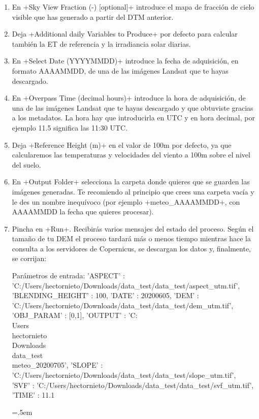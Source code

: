 \documentclass[a4paper,11pt]{article}
\newenvironment{cverbatim}
 {\SaveVerbatim{cverb}}
 {\endSaveVerbatim
  \flushleft\fboxrule=0pt\fboxsep=.5em
  \colorbox{bg}{\BUseVerbatim{cverb}}%
  \endflushleft
}
\begin{document}
\begin{enumerate}
  \item En \cverb+Sky View Fraction (-) [optional]+ introduce el mapa de fracción de cielo visible que has generado a partir del DTM anterior.
  
  \item Deja \cverb+Additional daily Variables to Produce+ por defecto para calcular también la ET de referencia y la irradiancia solar diarias.
  
  \item En \cverb+Select Date (YYYYMMDD)+ introduce la fecha de adquisición, en formato AAAAMMDD, de una de las imágenes Landsat que te hayas descargado.
  
  \item En \cverb+Overpass Time (decimal hours)+ introduce la hora de adquisición, de una de las imágenes Landsat que te hayas descargado y que obtuviste gracias a los metadatos. La hora hay que introducirla en UTC y en hora decimal, por ejemplo 11.5 significa las 11:30 UTC.
  
  \item Deja \cverb+Reference Height (m)+ en el valor de 100m por defecto, ya que calcularemos las temperaturas y velocidades del viento a 100m sobre el nivel del suelo.
  
  \item En \cverb+Output Folder+ selecciona la carpeta donde quieres que se guarden las imágenes generadas. Te recomiendo al principio que crees una carpeta vacía y le des un nombre inequívoco (por ejemplo \cverb+meteo_AAAAMMDD+, con AAAAMMDD la fecha que quieres procesar).
  
  \item Pincha en \cverb+Run+. Recibirás varios mensajes del estado del proceso. Según el tamaño de tu DEM el proceso tardará más o menos tiempo mientras hace la consulta a los servidores de Copernicus, se descargan los datos y, finalmente, se corrijan:
  {\tiny \begin{cverbatim}
Parámetros de entrada:
{ 'ASPECT' : 'C:/Users/hectornieto/Downloads/data_test/data_test/aspect_utm.tif', 
'BLENDING_HEIGHT' : 100, 'DATE' : 20200605, 
'DEM' : 'C:/Users/hectornieto/Downloads/data_test/data_test/dem_utm.tif', 'OBJ_PARAM' : [0,1], 
'OUTPUT' : 'C:\\Users\\hectornieto\\Downloads\\data_test\\meteo_20200705', 
'SLOPE' : 'C:/Users/hectornieto/Downloads/data_test/data_test/slope_utm.tif', 
'SVF' : 'C:/Users/hectornieto/Downloads/data_test/data_test/svf_utm.tif', 'TIME' : 11.1 }


\end{cverbatim}}
\end{enumerate}
\end{document}
